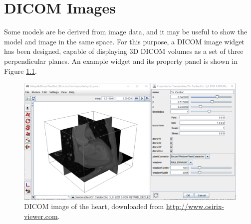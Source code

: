 
\let\olditem\item
\newcommand{\lstitem}[2][]{\olditem[{\protect\texttt{#1}}]\mbox{}\newline#2}
\newenvironment{lstdescription}{%
   \iflatexml
   \begin{description}
   \else
   \begin{description}[nolistsep]
   \fi
   \let\item\lstitem
}{\end{description}}

\newenvironment{tightemize}{%
   \iflatexml
   \begin{itemize}
   \else
   \begin{itemize}[nolistsep,noitemsep]
   \fi
}{\end{itemize}}


\chapter{DICOM Images}
\label{sec:dicom}

Some models are be derived from image data, and it may be useful to show the model
and image in the same space.  For this purpose, a DICOM image widget has been designed,
capable of displaying 3D DICOM volumes as a set of three perpendicular planes.  An
example widget and its property panel is shown in Figure \ref{fig:dicom:heart}.

\begin{figure}[!ht]
   \begin{center}
      \includegraphics[width=\imglength]{images/dicom_heart}
      \caption{DICOM image of the heart, 
      downloaded from \url{http://www.osirix-viewer.com}. \label{fig:dicom:heart}}
   \end{center}
\end{figure}

